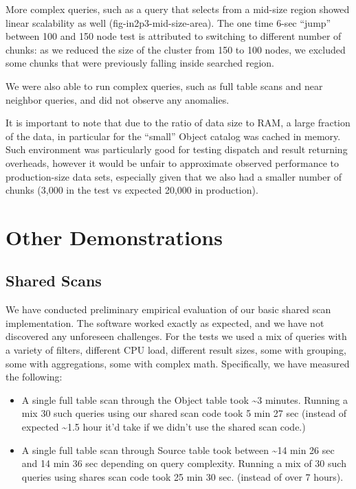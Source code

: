 \documentclass[DM,lsstdraft,toc]{lsstdoc}
\begin{document}
More complex queries, such as a query that selects from a mid-size
region showed linear scalability as well (fig-in2p3-mid-size-area). The
one time 6-sec ``jump'' between 100 and 150 node test is attributed to
switching to different number of chunks: as we reduced the size of the
cluster from 150 to 100 nodes, we excluded some chunks that were
previously falling inside searched region.

We were also able to run complex queries, such as full table scans and
near neighbor queries, and did not observe any anomalies.

It is important to note that due to the ratio of data size to RAM, a
large fraction of the data, in particular for the ``small'' Object
catalog was cached in memory. Such environment was particularly good for
testing dispatch and result returning overheads, however it would be
unfair to approximate observed performance to production-size data sets,
especially given that we also had a smaller number of chunks (3,000 in
the test vs expected 20,000 in production).

\section{Other Demonstrations}\label{other-demonstrations}

\subsection{Shared Scans}\label{shared-scans-1}

We have conducted preliminary empirical evaluation of our basic shared
scan implementation. The software worked exactly as expected, and we
have not discovered any unforeseen challenges. For the tests we used a
mix of queries with a variety of filters, different CPU load, different
result sizes, some with grouping, some with aggregations, some with
complex math. Specifically, we have measured the following:

\begin{itemize}
\item
  A single full table scan through the Object table took
  \textasciitilde{}3 minutes. Running a mix 30 such queries using our
  shared scan code took 5 min 27 sec (instead of expected
  \textasciitilde{}1.5 hour it'd take if we didn't use the shared scan
  code.)
\item
  A single full table scan through Source table took between
  \textasciitilde{}14 min 26 sec and 14 min 36 sec depending on query
  complexity. Running a mix of 30 such queries using shares scan code
  took 25 min 30 sec. (instead of over 7 hours).
\end{itemize}
\end{document}
